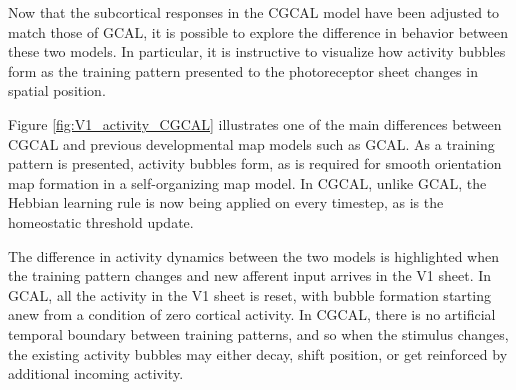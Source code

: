 \documentclass[phd,ianc,twoside]{infthesis}
\begin{document}
Now that the subcortical responses in the CGCAL model have been adjusted
to match those of GCAL, it is possible to explore the difference in
behavior between these two models. In particular, it is instructive to
visualize how activity bubbles form as the training pattern presented
to the photoreceptor sheet changes in spatial position.

Figure \ref{fig:V1_activity_CGCAL} illustrates one of the main
differences between CGCAL and previous developmental map models such as
GCAL. As a training pattern is presented, activity bubbles form, as is
required for smooth orientation map formation in a self-organizing map
model. In CGCAL, unlike GCAL, the Hebbian learning rule is now being
applied on every timestep, as is the homeostatic threshold update.

The difference in activity dynamics between the two models is
highlighted when the training pattern changes and new afferent input
arrives in the V1 sheet. In GCAL, all the activity in the V1 sheet is
reset, with bubble formation starting anew from a condition of zero cortical
activity. In CGCAL, there is no artificial temporal boundary between
training patterns, and so when the stimulus changes, the existing activity
bubbles may either decay, shift position, or get reinforced by additional
incoming activity.
\end{document}
